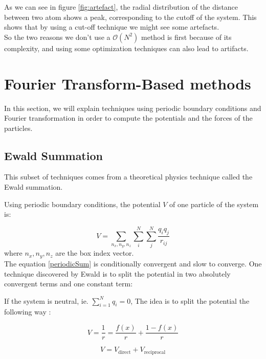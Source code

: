 \documentclass[12pt,twoside,a4paper]{report}
\begin{document}
As we can see in figure \ref{fig:artefact},  the radial distribution of the distance between two atom shows a peak, corresponding to the cutoff of the system. This shows that by using a cut-off technique we might see some artefacts.\\

So the two reasons we don't use a $\mathcal{O}(N^2)$ method is first because of its complexity, and using some optimization techniques can also lead to artifacts.





\section{Fourier Transform-Based methods}

In this section, we will explain techniques using periodic boundary conditions and Fourier transformation in order to compute the potentials and the forces of the particles.

\subsection{Ewald Summation}

This subset of techniques comes from a theoretical physics technique called the Ewald summation.

Using periodic boundary conditions, the potential $V$ of one particle of the system is:

\begin{equation}
	V = \sum_{n_x,n_y,n_z} \sum_{i}^{N} \sum_{j}^{N} \frac{q_i q_j}{r_{ij}}
	\label{periodicSum}
\end{equation}
where $n_x,n_y,n_z$ are the box index vector.\\

The equation \ref{periodicSum} is conditionally convergent and slow to converge. One technique discovered by Ewald is to split the potential in two absolutely convergent terms and one constant term:


If the system is neutral, ie. $\sum_{i=1}^N q_i = 0$, The idea is to split the potential the following way :

\begin{equation}
    V = \frac{1}{r} = \frac{f(x)}{r} + \frac{1 - f(x)}{r}
\end{equation}


\begin{equation}
    V = V_{\text{direct}} + V_{\text{reciprocal}}
\end{equation}
\end{document}
